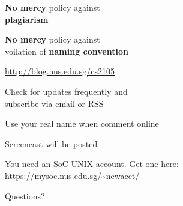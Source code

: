 \begin{frame}
\begin{center}
\large
	\textbf{No mercy} policy against\\\textbf{plagiarism}
\end{center}
\end{frame}

\begin{frame}
\begin{center}
\large
	\textbf{No mercy} policy against\\voilation of \textbf{naming convention}
\end{center}
\end{frame}

\begin{frame}
\begin{center}
\large
	\url{http://blog.nus.edu.sg/cs2105}
\end{center}
\end{frame}

\begin{frame}
\begin{center}
\large
Check for updates frequently and\\subscribe via email or RSS
\end{center}
\end{frame}

\begin{frame}
\begin{center}
\large Use your real name when comment online
\end{center}
\end{frame}

\begin{frame} \begin{center} \large
Screencast will be posted 
\end{center} \end{frame}

\begin{frame} \begin{center} \large
You need an SoC UNIX account.  Get one here:\\
\url{https://mysoc.nus.edu.sg/~newacct/}
\end{center} \end{frame}

\begin{frame}
\begin{center}
\large
Questions?
\end{center}
\end{frame}

